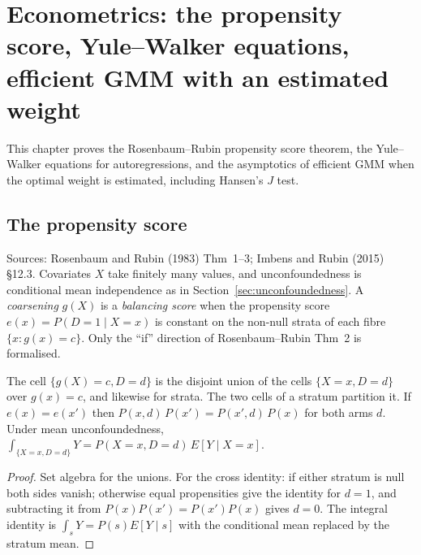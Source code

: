 \chapter{Econometrics: the propensity score, Yule--Walker equations, efficient GMM with an estimated weight}
\label{chap:econometrics6}

This chapter proves the Rosenbaum--Rubin propensity score theorem, the Yule--Walker equations for autoregressions,
and the asymptotics of efficient GMM when the optimal weight is estimated, including Hansen's $J$ test.

\section{The propensity score}
\label{sec:pscore}

Sources: Rosenbaum and Rubin (1983) Thm~1--3; Imbens and Rubin (2015) \S12.3. Covariates $X$ take finitely many
values, and unconfoundedness is conditional mean independence as in Section~\ref{sec:unconfoundedness}. A
\emph{coarsening} $g(X)$ is a \emph{balancing score} when the propensity score $e(x) = P(D = 1\mid X = x)$ is constant
on the non-null strata of each fibre $\{x : g(x) = c\}$. Only the ``if'' direction of Rosenbaum--Rubin Thm~2 is
formalised.

\begin{lemma}
\label{lem:pscore-cells}
\leanok
{}
The cell $\{g(X) = c, D = d\}$ is the disjoint union of the cells $\{X = x, D = d\}$ over $g(x) = c$, and likewise for
strata. The two cells of a stratum partition it. If $e(x) = e(x')$ then $P(x, d)\,P(x') = P(x', d)\,P(x)$ for both
arms $d$. Under mean unconfoundedness, $\int_{\{X=x,D=d\}} Y = P(X=x,D=d)\,E[Y\mid X = x]$.
\end{lemma}
\begin{proof}
\leanok
Set algebra for the unions. For the cross identity: if either stratum is null both sides vanish; otherwise equal
propensities give the identity for $d = 1$, and subtracting it from $P(x)P(x') = P(x')P(x)$ gives $d = 0$. The integral
identity is $\int_s Y = P(s)E[Y\mid s]$ with the conditional mean replaced by the stratum mean.
\end{proof}

